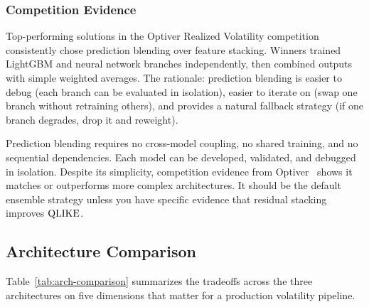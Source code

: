 \subsubsection{Competition Evidence}

Top-performing solutions in the Optiver Realized Volatility
competition~\citep{Optiver2021} consistently chose prediction blending
over feature stacking.  Winners trained LightGBM and neural network
branches independently, then combined outputs with simple weighted
averages.  The rationale: prediction blending is easier to debug
(each branch can be evaluated in isolation), easier to iterate on
(swap one branch without retraining others), and provides a natural
fallback strategy (if one branch degrades, drop it and reweight).

\begin{keyidea}
Prediction blending requires no cross-model coupling, no shared
training, and no sequential dependencies.  Each model can be
developed, validated, and debugged in isolation.  Despite its
simplicity, competition evidence from Optiver~\citep{Optiver2021}
shows it matches or outperforms more complex architectures.  It should
be the default ensemble strategy unless you have specific evidence that
residual stacking improves $\operatorname{QLIKE}$.
\end{keyidea}


\subsection{Architecture Comparison}\label{sec:hybrid:arch-compare}

Table~\ref{tab:arch-comparison} summarizes the tradeoffs across the
three architectures on five dimensions that matter for a production
volatility pipeline.

